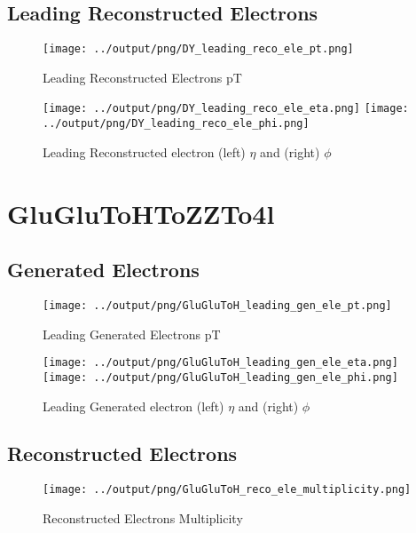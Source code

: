 \documentclass[11pt]{book}
\begin{document}
\clearpage


\section{Leading Reconstructed Electrons}

\begin{figure}[ht]
\centering
\texttt{[image: ../output/png/DY\_leading\_reco\_ele\_pt.png]}
\caption{Leading Reconstructed Electrons pT}
\label{fig:dy_leading_reco_ele_pt}
\end{figure}

\begin{figure}[ht]
\centering
\texttt{[image: ../output/png/DY\_leading\_reco\_ele\_eta.png]}
\texttt{[image: ../output/png/DY\_leading\_reco\_ele\_phi.png]}
\caption{Leading Reconstructed electron (left) $\eta$ and (right) $\phi$}
\label{fig:dy_leading_reco_ele_eta_phi}
\end{figure}
\clearpage

\chapter{GluGluToHToZZTo4l}
\section{Generated Electrons}
\begin{figure}[ht]
\centering
\texttt{[image: ../output/png/GluGluToH\_leading\_gen\_ele\_pt.png]}
\caption{Leading Generated Electrons pT}
\label{fig:gluglu_leading_gen_ele_pt}
\end{figure}

\begin{figure}[ht]
\centering
\texttt{[image: ../output/png/GluGluToH\_leading\_gen\_ele\_eta.png]}
\texttt{[image: ../output/png/GluGluToH\_leading\_gen\_ele\_phi.png]}
\caption{Leading Generated electron (left) $\eta$ and (right) $\phi$}
\label{fig:gluglu_leading_gen_ele_eta_phi}
\end{figure}
\clearpage

\section{Reconstructed Electrons}

\begin{figure}[ht]
\centering
\texttt{[image: ../output/png/GluGluToH\_reco\_ele\_multiplicity.png]}
\caption{Reconstructed Electrons Multiplicity}
\label{fig:gluglu_reco_ele_multiplicity}
\end{figure}
\end{document}
